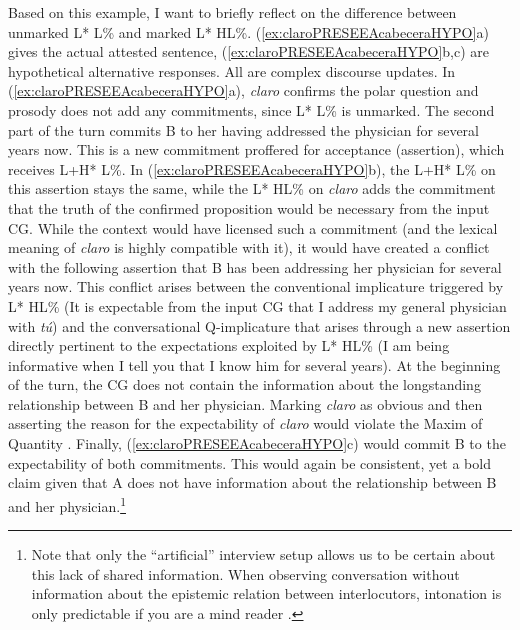 Based on this example, I want to briefly reflect on the difference between unmarked L* L\% and marked L* HL\%. (\ref{ex:claroPRESEEAcabeceraHYPO}a) gives the actual attested sentence, (\ref{ex:claroPRESEEAcabeceraHYPO}b,c) are hypothetical alternative responses. All are complex discourse updates. In (\ref{ex:claroPRESEEAcabeceraHYPO}a), \textit{claro} confirms the polar question and prosody does not add any commitments, since L* L\% is unmarked. The second part of the turn commits B to her having addressed the physician for several years now. This is a new commitment proffered for acceptance (assertion), which receives L+H* L\%. In (\ref{ex:claroPRESEEAcabeceraHYPO}b), the L+H* L\% on this assertion stays the same, while the L* HL\% on \textit{claro} adds the commitment that the truth of the confirmed proposition would be necessary from the input \ac{CG}. While the context would have licensed such a commitment (and the lexical meaning of \textit{claro} is highly compatible with it), it would have created a conflict with the following assertion that B has been addressing her physician for several years now. This conflict arises between the conventional implicature triggered by L* HL\% (It is expectable from the input \ac{CG} that I address my general physician with \textit{tú}) and the conversational Q-implicature that arises through a new assertion directly pertinent to the expectations exploited by L* HL\% (I am being informative when I tell you that I know him for several years). At the beginning of the turn, the \ac{CG} does not contain the information about the longstanding relationship between B and her physician. Marking \textit{claro} as obvious and then asserting the reason for the expectability of \textit{claro} would violate the Maxim of Quantity \citep{Grice.1975,Horn.2010}. Finally, (\ref{ex:claroPRESEEAcabeceraHYPO}c) would commit B to the expectability of both commitments. This would again be consistent, yet a bold claim given that A does not have information about the relationship between B and her physician.\footnote{Note that only the ``artificial'' interview setup allows us to be certain about this lack of shared information. When observing conversation without information about the epistemic relation between interlocutors, intonation is only predictable if you are a mind reader \citep{Bolinger.1972}.}

